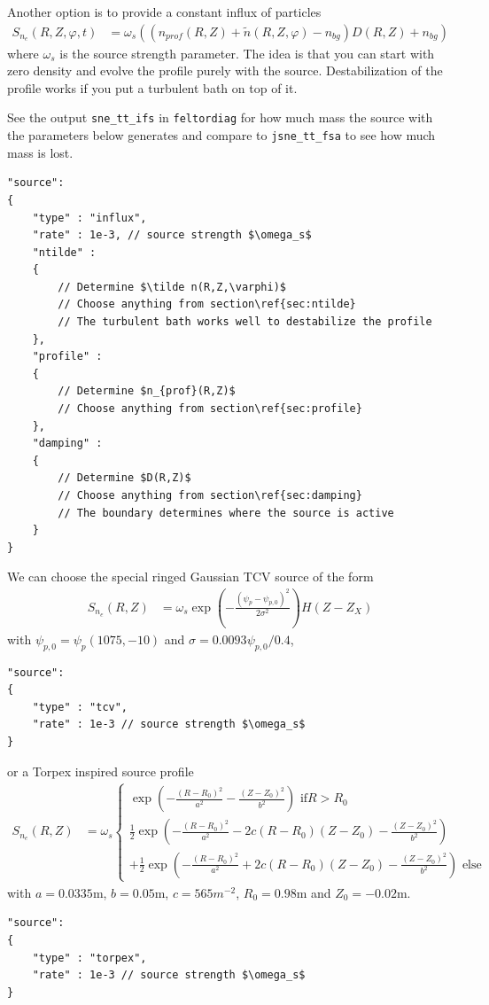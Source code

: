 Another option is to provide a constant influx of particles
\begin{align}
    S_{n_e}(R,Z,\varphi, t) &= \omega_s \left( (n_{prof}(R,Z) + \tilde n(R,Z,\varphi) - n_{bg})D(R,Z) + n_{bg}\right)
\end{align}
where $\omega_s$ is the source strength parameter.
The idea is that you can start with zero density and evolve the profile purely
with the source. Destabilization of the profile works if you put a turbulent
bath on top of it.
\begin{tcolorbox}[title=Note]
    See the output \texttt{sne_tt_ifs} in \texttt{feltordiag} for how much mass
the source with the parameters below generates and compare to
\texttt{jsne_tt_fsa} to see how much mass is lost.
\end{tcolorbox}
\begin{verbatim}
"source":
{
    "type" : "influx",
    "rate" : 1e-3, // source strength $\omega_s$
    "ntilde" :
    {
        // Determine $\tilde n(R,Z,\varphi)$
        // Choose anything from section\ref{sec:ntilde}
        // The turbulent bath works well to destabilize the profile
    },
    "profile" :
    {
        // Determine $n_{prof}(R,Z)$
        // Choose anything from section\ref{sec:profile}
    },
    "damping" :
    {
        // Determine $D(R,Z)$
        // Choose anything from section\ref{sec:damping}
        // The boundary determines where the source is active
    }
}
\end{verbatim}

We can choose the special ringed Gaussian TCV source of the form
\begin{align}
    S_{n_e}(R,Z) &= \omega_s \exp\left( -\frac{(\psi_p-\psi_{p,0})^2}{2\sigma^2}\right)H(Z-Z_X)
\end{align}
with $\psi_{p,0} = \psi_p(1075, -10)$ and $\sigma = 0.0093\psi_{p,0}/0.4$,
\begin{verbatim}
"source":
{
    "type" : "tcv",
    "rate" : 1e-3 // source strength $\omega_s$
}
\end{verbatim}
or a Torpex inspired source profile
\begin{align} \label{eq:electron_source_torpex}
  S_{n_e}(R,Z) &= \omega_s
  \begin{cases}
    \exp\left( - \frac{(R-R_0)^2}{a^2 }- \frac{(Z-Z_0)^2}{b^2}\right) \text{ if} R > R_0 \\
    \frac{1}{2}\exp\left( - \frac{(R-R_0)^2}{a^2} -2c(R-R_0)(Z-Z_0)- \frac{(Z-Z_0)^2}{b^2} \right) \\
  +\frac{1}{2}\exp\left( - \frac{(R-R_0)^2}{a^2} +2c(R-R_0)(Z-Z_0)- \frac{(Z-Z_0)^2}{b^2} \right) \text{ else}
  \end{cases}
\end{align}
with $a=0.0335$m, $b=0.05$m, $c=565m^{-2}$, $R_0=0.98$m and $Z_0=-0.02$m.
\begin{verbatim}
"source":
{
    "type" : "torpex",
    "rate" : 1e-3 // source strength $\omega_s$
}
\end{verbatim}

